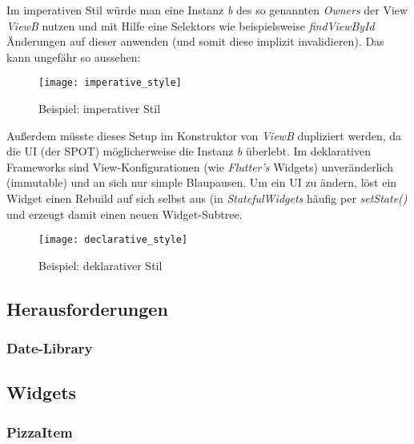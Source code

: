 Im imperativen Stil würde man eine Instanz \textit{b} des so
genannten \textit{Owners} der View \textit{ViewB} nutzen
und mit Hilfe eine Selektors wie beispielsweise \textit{findViewById}
Änderungen auf dieser anwenden (und somit diese implizit invalidieren).
Das kann ungefähr so aussehen:

\begin{figure}[H]
    \centering
    \texttt{[image: imperative\_style]}
    \caption{Beispiel: imperativer Stil}
\end{figure}

Außerdem müsste dieses Setup im Konstruktor von \textit{ViewB} dupliziert
werden, da die UI (der \ac{SPOT}) möglicherweise die Instanz \textit{b} überlebt.
Im deklarativen Frameworks sind View-Konfigurationen
(wie \textit{Flutter's} Widgets) unveränderlich (immutable) und an sich
nur simple Blaupausen. Um ein UI zu ändern, löst ein Widget einen Rebuild
auf sich selbst aus (in \textit{StatefulWidgets} häufig per \textit{setState()}
und erzeugt damit einen neuen Widget-Subtree.

\begin{figure}[H]
    \centering
    \texttt{[image: declarative\_style]}
    \caption{Beispiel: deklarativer Stil}
\end{figure}



\subsection{Herausforderungen}
\subsubsection{Date-Library}

\subsection{Widgets}
\subsubsection{PizzaItem}
